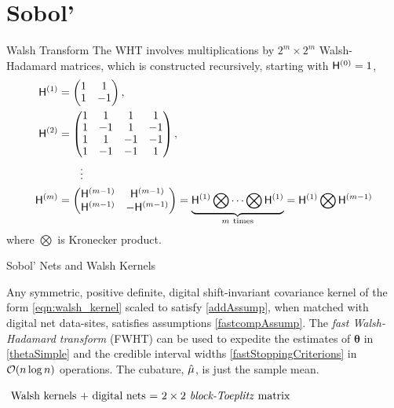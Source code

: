\documentclass[handout, 10pt,compress,xcolor={usenames,dvipsnames}]{beamer} %
\newcommand{\bm}[1]{\boldsymbol{#1}}
\renewcommand{\vtheta}{{\bm{\theta}}}
\newcommand{\redroundmathbox}[1]{\parbox{\widthof{$#1$\hspace{1em}}}
	{\begin{mdframed}[style=redshade]\centering $#1$ \end{mdframed}}}
\begin{document}
\section{Sobol'}


\begin{frame}{Walsh Transform}
	The WHT involves multiplications by $2^m \times 2^m$ Walsh-Hadamard matrices, which is constructed recursively, starting with $\mathsf{H}^{(0)} = 1$,
	\begin{align}
	\nonumber
	\arraycolsep=1.4pt\def\arraystretch{0.9}
	\mH^{(1)} &=
	\begin{pmatrix}
	1 & 1 \\ 1 & -1
	\end{pmatrix}, \\
	\nonumber
	\mH^{(2)} &= 
	\begin{pmatrix}
	1 & 1 & 1 & 1 \\ 
	1 & -1 & 1 & -1 \\
	1 & 1 & -1 & -1 \\ 
	1 & -1 & -1 & 1 \\
	\end{pmatrix}, \\
	\nonumber
	& \qquad \vdots
	\\
	\label{eqn:hadamard_matrix}
	\mH^{(m)} &= 
	\begin{pmatrix}
	\mH^{(m-1)} & \mH^{(m-1)} \\ \mH^{(m-1)} & -\mH^{(m-1)}
	\end{pmatrix} 
	= \underbrace{\mH^{(1)} \bigotimes \cdots \bigotimes \mH^{(1)}}_{m \ \text{times}} 
	= \mH^{(1)} \bigotimes \mH^{(m-1)}
	\end{align}
	where $\bigotimes$ is Kronecker product.
\end{frame}






\begin{frame}{Sobol' Nets and Walsh Kernels}
	
	\begin{theorem}
		Any symmetric, positive definite, digital shift-invariant covariance kernel of the form \eqref{eqn:walsh_kernel} scaled to satisfy \eqref{addAssump}, when matched with digital net data-sites, satisfies assumptions \eqref{fastcompAssump}.  The \emph{fast Walsh-Hadamard transform} (FWHT) can be used to expedite the estimates of $\vtheta$ in \eqref{thetaSimple} and the credible interval widths \eqref{fastStoppingCriterions} in $\operatorname{{\mathcal O}}(n \log n)$ operations. The cubature, $\hat{\mu}$, is just the sample mean.
	\end{theorem}
	
	\centering\redroundmathbox{\text{
			Walsh kernels + digital nets = \emph{$2\times 2$ block-Toeplitz} matrix
	}}
	
\end{frame}
\end{document}
